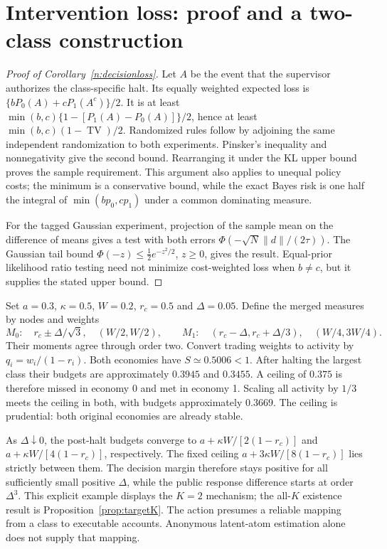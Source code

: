 \section{Intervention loss: proof and a two-class construction}\label{app:revisiondecision}

\begin{proof}[Proof of Corollary~\ref{n:decisionloss}]
Let $A$ be the event that the supervisor authorizes the class-specific halt. Its equally weighted expected loss is $\{bP_0(A)+cP_1(A^c)\}/2$. It is at least
$\min(b,c)\{1-[P_1(A)-P_0(A)]\}/2$, hence at least $\min(b,c)(1-\operatorname{TV})/2$. Randomized rules follow by adjoining the same independent randomization to both experiments. Pinsker's inequality and nonnegativity give the second bound. Rearranging it under the KL upper bound proves the sample requirement. This argument also applies to unequal policy costs; the minimum is a conservative bound, while the exact Bayes risk is one half the integral of $\min(bp_0,cp_1)$ under a common dominating measure.

For the tagged Gaussian experiment, projection of the sample mean on the difference of means gives a test with both errors $\Phi(-\sqrt N\|d\|/(2\tau))$. The Gaussian tail bound $\Phi(-z)\le\tfrac12 e^{-z^2/2}$, $z\ge0$, gives the result. Equal-prior likelihood ratio testing need not minimize cost-weighted loss when $b\ne c$, but it supplies the stated upper bound.
\end{proof}

Set $a=0.3$, $\kappa=0.5$, $W=0.2$, $r_c=0.5$ and $\Delta=0.05$. Define the merged measures by nodes and weights
\[
M_0:\quad r_c\pm\Delta/\sqrt3,\quad (W/2,W/2),
\qquad
M_1:\quad (r_c-\Delta,r_c+\Delta/3),\quad(W/4,3W/4).
\]
Their moments agree through order two. Convert trading weights to activity by $q_i=w_i/(1-r_i)$. Both economies have $S\simeq0.5006<1$. After halting the largest class their budgets are approximately $0.3945$ and $0.3455$. A ceiling of $0.375$ is therefore missed in economy 0 and met in economy 1. Scaling all activity by $1/3$ meets the ceiling in both, with budgets approximately $0.3669$. The ceiling is prudential: both original economies are already stable.

As $\Delta\downarrow0$, the post-halt budgets converge to $a+\kappa W/[2(1-r_c)]$ and $a+\kappa W/[4(1-r_c)]$, respectively. The fixed ceiling $a+3\kappa W/[8(1-r_c)]$ lies strictly between them. The decision margin therefore stays positive for all sufficiently small positive $\Delta$, while the public response difference starts at order $\Delta^3$. This explicit example displays the $K=2$ mechanism; the all-$K$ existence result is Proposition~\ref{prop:targetK}. The action presumes a reliable mapping from a class to executable accounts. Anonymous latent-atom estimation alone does not supply that mapping.
